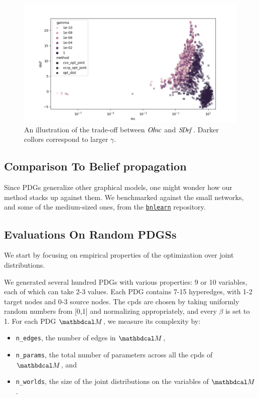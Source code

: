 \documentclass{article}
\begin{document}
\begin{figure}
    \includegraphics[width=\linewidth]{figs/inc-idef2}
    \caption{An illustration of the trade-off between $\mathit{O\mskip-2.5muI\mskip-3.5mun\mskip-1.7muc}$ and $\mathit{S\mskip-3.5muD\mskip-2.5mue\mskip-1.5muf}_{}$. Darker collors correspond to larger $\gamma$.}\label{fig:inc-idef}
\end{figure}

\subsection{Comparison To Belief propagation}

Since PDGs generalize other graphical models, one might wonder how our method stacks up against them.
We benchmarked against the small networks, and some of the medium-sized ones, from the \href{https://www.bnlearn.com/bnrepository/}{\texttt{bnlearn}} repository.



\subsection{Evaluations On Random PDGSs}
We start by focusing on empirical properties of the optimization over joint distributions.

We generated several hundred PDGs with various properties: 9 or 10 variables, each of which can take 2-3 values. Each PDG contains 7-15 hyperedges, with 1-2 target nodes and 0-3 source nodes. The cpds are chosen by taking uniformly random numbers from [0,1] and normalizing appropriately, and every $\beta$ is set to 1.
For each PDG $\dg M$, we measure its complexity by:
\begin{itemize}[nosep]
    \item \texttt{n\_edges}, the number of edges in $\dg M$,
    \item \texttt{n\_params}, the total number of parameters across all the cpds of $\dg M$, and
    \item \texttt{n\_worlds}, the size of the joint distributions on the variables of $\dg M$.
\end{itemize}
\end{document}
